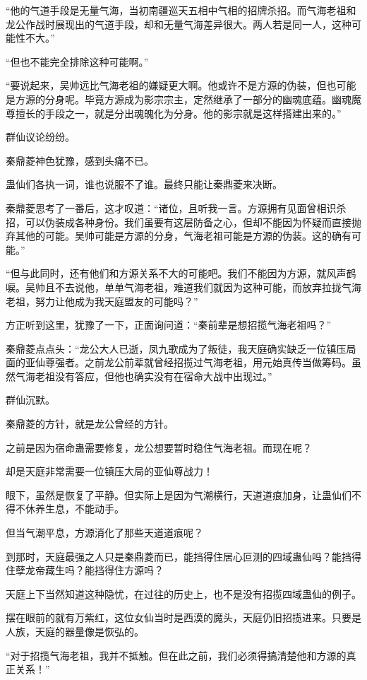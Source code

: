 \begin{this_body}
“他的气道手段是无量气海，当初南疆巡天五相中气相的招牌杀招。而气海老祖和龙公作战时展现出的气道手段，却和无量气海差异很大。两人若是同一人，这种可能性不大。”

“但也不能完全排除这种可能啊。”

“要说起来，吴帅远比气海老祖的嫌疑更大啊。他或许不是方源的伪装，但也可能是方源的分身呢。毕竟方源成为影宗宗主，定然继承了一部分的幽魂底蕴。幽魂魔尊擅长的手段之一，就是分出魂魄化为分身。他的影宗就是这样搭建出来的。”

群仙议论纷纷。

秦鼎菱神色犹豫，感到头痛不已。

蛊仙们各执一词，谁也说服不了谁。最终只能让秦鼎菱来决断。

秦鼎菱思考了一番后，这才叹道：“诸位，且听我一言。方源拥有见面曾相识杀招，可以伪装成各种身份。我们虽要有这层防备之心，但却不能因为怀疑而直接抛弃其他的可能。吴帅可能是方源的分身，气海老祖可能是方源的伪装。这的确有可能。”

“但与此同时，还有他们和方源关系不大的可能吧。我们不能因为方源，就风声鹤唳。吴帅且不去说他，单单气海老祖，难道我们就因为这种可能，而放弃拉拢气海老祖，努力让他成为我天庭盟友的可能吗？”

方正听到这里，犹豫了一下，正面询问道：“秦前辈是想招揽气海老祖吗？”

秦鼎菱点点头：“龙公大人已逝，凤九歌成为了叛徒，我天庭确实缺乏一位镇压局面的亚仙尊强者。之前龙公前辈就曾经招揽过气海老祖，用元始真传当做筹码。虽然气海老祖没有答应，但他也确实没有在宿命大战中出现过。”

群仙沉默。

秦鼎菱的方针，就是龙公曾经的方针。

之前是因为宿命蛊需要修复，龙公想要暂时稳住气海老祖。而现在呢？

却是天庭非常需要一位镇压大局的亚仙尊战力！

眼下，虽然是恢复了平静。但实际上是因为气潮横行，天道道痕加身，让蛊仙们不得不休养生息，不能动手。

但当气潮平息，方源消化了那些天道道痕呢？

到那时，天庭最强之人只是秦鼎菱而已，能挡得住居心叵测的四域蛊仙吗？能挡得住孽龙帝藏生吗？能挡得住方源吗？

天庭上下当然知道这种隐忧，在过往的历史上，也不是没有招揽四域蛊仙的例子。

摆在眼前的就有万紫红，这位女仙当时是西漠的魔头，天庭仍旧招揽进来。只要是人族，天庭的器量像是恢弘的。

“对于招揽气海老祖，我并不抵触。但在此之前，我们必须得搞清楚他和方源的真正关系！”


\end{this_body}
